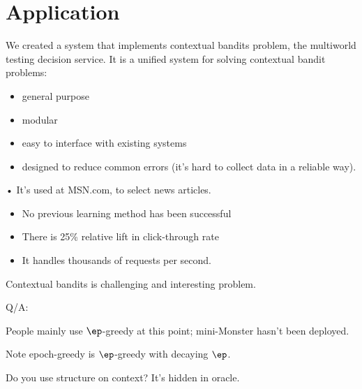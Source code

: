 \section{Application}

We created a system that implements contextual bandits problem, the multiworld testing decision service. 
It is a unified system for solving contextual bandit problems:
\begin{itemize}
\item
general purpose
\item
modular
\item
easy to interface with existing systems
\item
designed to reduce common errors (it's hard to collect data in a reliable way).
\end{itemize}•
It's used at MSN.com, to select news articles.
\begin{itemize}
\item
No previous learning method has been successful
\item
There is 25\% relative lift in click-through rate
\item
It handles thousands of requests per second.
\end{itemize}
Contextual bandits is challenging and interesting problem.


Q/A:

People mainly use $\ep$-greedy at this point; mini-Monster hasn't been deployed.

Note epoch-greedy is $\ep$-greedy with decaying $\ep$.

Do you use structure on context? It's hidden in oracle.


\printbibliography
